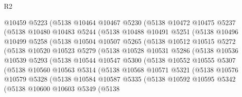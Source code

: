 \begin{lexlean}{R2}
\begin{coremodule}
          @10459
          @5223
          (@5138
            @10464
            @10467
            @5230
            (@5138
              @10472
              @10475
              @5237
              (@5138
                @10480
                @10483
                @5244
                (@5138
                  @10488
                  @10491
                  @5251
                  (@5138
                    @10496
                    @10499
                    @5258
                    (@5138
                      @10504
                      @10507
                      @5265
                      (@5138
                        @10512
                        @10515
                        @5272
                        (@5138
                          @10520
                          @10523
                          @5279
                          (@5138
                            @10528
                            @10531
                            @5286
                            (@5138
                              @10536
                              @10539
                              @5293
                              (@5138
                                @10544
                                @10547
                                @5300
                                (@5138
                                  @10552
                                  @10555
                                  @5307
                                  (@5138
                                    @10560
                                    @10563
                                    @5314
                                    (@5138
                                      @10568
                                      @10571
                                      @5321
                                      (@5138
                                        @10576
                                        @10579
                                        @5328
                                        (@5138
                                          @10584
                                          @10587
                                          @5335
                                          (@5138
                                            @10592
                                            @10595
                                            @5342
                                            (@5138
                                              @10600
                                              @10603
                                              @5349
                                              (@5138

\end{coremodule}
\end{lexlean}
